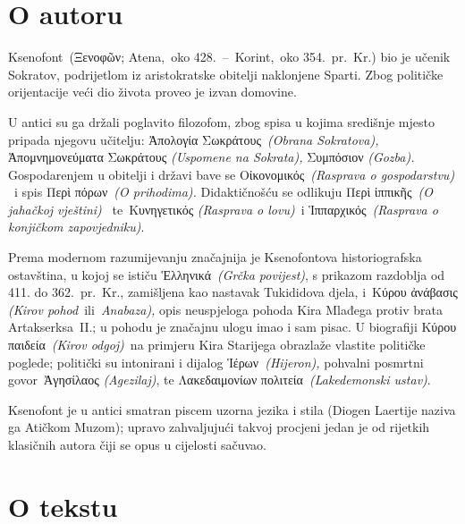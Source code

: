 \section*{O autoru}

Ksenofont \textgreek[variant=ancient]{(Ξενοφῶν}; Atena, oko 428. – Korint, oko 354. pr.~Kr.) bio je učenik Sokratov, podrijetlom iz aristokratske obitelji naklonjene Sparti. Zbog političke orijentacije veći dio života proveo je izvan domovine. 

U antici su ga držali poglavito filozofom, zbog spisa u kojima središnje mjesto pripada njegovu učitelju: \textgreek[variant=ancient]{Ἀπολογία Σωκράτους} \textit{(Obrana Sokratova),} \textgreek[variant=ancient]{Ἀπομνημονεύματα Σωκράτους} \textit{(Uspomene na Sokrata),} \textgreek[variant=ancient]{Συμπόσιον} \textit{(Gozba).}  Gospodarenjem u obitelji i državi bave se \textgreek[variant=ancient]{Οἰκονομικός} \textit{(Rasprava o gospodarstvu)}  i spis \textgreek[variant=ancient]{Περὶ πόρων} \textit{(O prihodima).}  Didaktičnošću se odlikuju \textgreek[variant=ancient]{Περὶ ἱππικῆς} \textit{(O jahačkoj vještini)}  te \textgreek[variant=ancient]{Κυνηγετικός} \textit{(Rasprava o lovu)} i \textgreek[variant=ancient]{Ἱππαρχικός} \textit{(Ras\-pra\-va o konjičkom zapovjedniku)}.

Prema modernom razumijevanju značajnija je Ksenofontova historiografska ostavština, u kojoj se ističu \textgreek[variant=ancient]{Ἑλληνικά} \textit{(Grčka povijest)}, s prikazom razdoblja od 411. do 362. pr.~Kr., zamišljena kao nastavak Tukididova djela, i \textgreek[variant=ancient]{Κύρου ἀνάβασις} \textit{(Kirov pohod} ili \textit{A\-na\-baza),} opis neuspjeloga pohoda Kira Mlađega protiv brata Artakserksa II.; u pohodu je značajnu ulogu imao i sam pisac. U biografiji \textgreek[variant=ancient]{Κύρου παιδεία} \textit{(Kirov odgoj)} na primjeru Kira Starijega obrazlaže vlastite političke poglede; politički su intonirani i dijalog \textgreek[variant=ancient]{Ἱέρων} \textit{(Hijeron),}  pohvalni posmrtni govor \textgreek[variant=ancient]{Ἀγησίλαος} \textit{(Agezilaj)}, te \textgreek[variant=ancient]{Λακεδαιμονίων πολιτεία} \textit{(Lakedemonski ustav)}.


Ksenofont je u antici smatran piscem uzorna jezika i stila (Diogen Laertije naziva ga Atičkom Muzom); upravo zahvaljujući takvoj procjeni jedan je od rijetkih klasičnih autora čiji se opus u cijelosti sačuvao.

\section*{O tekstu}

